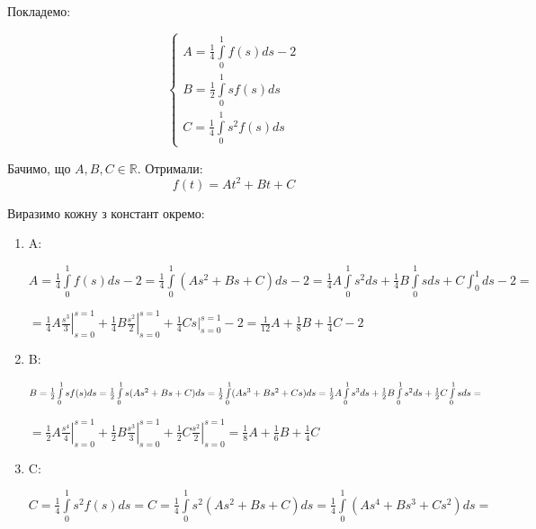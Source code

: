 \documentclass[a5paper, 20pt, titlepage]{article}
\newcommand{\Int}[1]{\int \limits_{0}^{1} #1 ds}
\begin{document}
\begin{enumerate}
\vspace{3mm}
Покладемо:

$$ 
\begin{cases}
A = \frac{1}{4} \int \limits_{0}^{1} f(s) ds - 2 \\ 
B = \frac{1}{2} \int \limits_{0}^{1} sf(s) ds \\
C = \frac{1}{4} \int \limits_{0}^{1} s^2 f(s) ds
\end{cases}
$$

\vspace{3mm}
Бачимо, що $A,B,C \in \mathbb{R}$. Отримали:
$$ f(t) = At^2 + Bt + C$$

Виразимо кожну з констант окремо:

\begin{enumerate}
\item A: 

$A = \frac{1}{4} \int \limits_{0}^{1} f(s) ds - 2 = \frac{1}{4} \int \limits_{0}^{1} (As^2 + Bs + C) ds - 2 = \frac{1}{4} A \int \limits_{0}^{1} s^2 ds + \frac{1}{4} B \int \limits_{0}^{1} s ds + C \int_{0}^{1} ds - 2 = $

\vspace{3mm}
\hspace{2mm}
$= \frac{1}{4} A \left. \frac{s^3}{3} \right|_{s = 0}^{s = 1} + \frac{1}{4} B \left. \frac{s^2}{2} \right|_{s = 0}^{s = 1} + \frac{1}{4}C \left. s \right|_{s = 0}^{s = 1} - 2 = \frac{1}{12} A + \frac{1}{8} B  + \frac{1}{4}C  - 2$

\vspace{3mm}
\item B:

$B =  \frac{1}{2} \int \limits_{0}^{1} sf(s) ds =  \frac{1}{2} \int \limits_{0}^{1} s(As^2 + Bs + C) ds = \frac{1}{2} \int \limits_{0}^{1} (As^3 + Bs^2 + Cs) ds = \frac{1}{2} A \Int{s^3} + \frac{1}{2} B \Int{s^2} + \nolinebreak \frac{1}{2} C \Int{s} =$

\vspace{3mm}
\hspace{2mm}
$= \frac {1}{2} A \left. \frac{s^4}{4}\right|_{s = 0}^{s = 1} + \frac{1}{2} B \left. \frac{s^3}{3} \right|_{s = 0}^{s = 1} + \frac{1}{2} C \left. \frac{s^2}{2}\right|_{s = 0}^{s = 1} = \frac{1}{8} A + \frac{1}{6} B + \frac{1}{4} C$

\newpage

\item C:

$C = \frac{1}{4} \int \limits_{0}^{1} s^2 f(s) ds = C = \frac{1}{4} \int \limits_{0}^{1} s^2 (As^2 + Bs + C) ds = \frac{1}{4} \Int{(As^4 + Bs^3 + Cs^2)} = $


\end{enumerate}
\end{enumerate}
\end{document}
